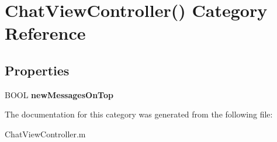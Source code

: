 \hypertarget{category_chat_view_controller_07_08}{\section{Chat\+View\+Controller() Category Reference}
\label{category_chat_view_controller_07_08}
}
\subsection*{Properties}
\begin{DoxyCompactItemize}
\item 
\hypertarget{category_chat_view_controller_07_08_a5d187afd9cd3a465a087e0e3e6b42c78}{B\+O\+O\+L {\bfseries new\+Messages\+On\+Top}}\label{category_chat_view_controller_07_08_a5d187afd9cd3a465a087e0e3e6b42c78}

\end{DoxyCompactItemize}


The documentation for this category was generated from the following file\+:\begin{DoxyCompactItemize}
\item 
Chat\+View\+Controller.\+m\end{DoxyCompactItemize}
